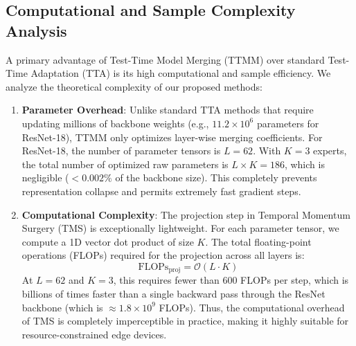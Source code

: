 \documentclass{article}
\theoremstyle{plain}
\theoremstyle{definition}
\theoremstyle{remark}
\begin{document}
\subsection{Computational and Sample Complexity Analysis}
\label{app:complexity}
A primary advantage of Test-Time Model Merging (TTMM) over standard Test-Time Adaptation (TTA) is its high computational and sample efficiency. We analyze the theoretical complexity of our proposed methods:
\begin{enumerate}
    \item \textbf{Parameter Overhead}: Unlike standard TTA methods that require updating millions of backbone weights (e.g., $11.2\times 10^6$ parameters for ResNet-18), TTMM only optimizes layer-wise merging coefficients. For ResNet-18, the number of parameter tensors is $L = 62$. With $K = 3$ experts, the total number of optimized raw parameters is $L \times K = 186$, which is negligible ($< 0.002\%$ of the backbone size). This completely prevents representation collapse and permits extremely fast gradient steps.
    \item \textbf{Computational Complexity}: The projection step in Temporal Momentum Surgery (TMS) is exceptionally lightweight. For each parameter tensor, we compute a 1D vector dot product of size $K$. The total floating-point operations (FLOPs) required for the projection across all layers is:
    \begin{equation}
        \text{FLOPs}_{\text{proj}} = \mathcal{O}(L \cdot K)
    \end{equation}
    At $L=62$ and $K=3$, this requires fewer than $600$ FLOPs per step, which is billions of times faster than a single backward pass through the ResNet backbone (which is $\approx 1.8 \times 10^9$ FLOPs). Thus, the computational overhead of TMS is completely imperceptible in practice, making it highly suitable for resource-constrained edge devices.
\end{enumerate}
\end{document}
